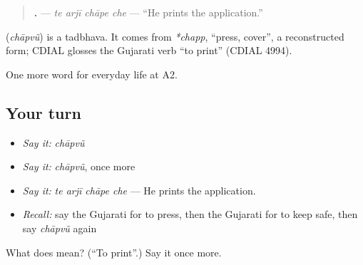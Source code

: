 \begin{quote}
\textbf{   .} — \emph{te arjī chāpe che} — \textquotedblleft{}He prints the application.\textquotedblright{}
\end{quote}

\begin{cousinweb}
\textbf{} (\emph{chāpvũ}) is a tadbhava. It comes from \emph{*chapp}, \textquotedblleft{}press, cover\textquotedblright{}, a reconstructed form; CDIAL glosses the Gujarati verb \textquotedblleft{}to print\textquotedblright{} (CDIAL 4994).
\end{cousinweb}

\begin{grammarlens}[title={What you've built}]
One more word for everyday life at A2.
\end{grammarlens}

\subsection*{Your turn}
\begin{itemize}
\raggedright
  \item \emph{Say it:} \emph{chāpvũ}
  \item \emph{Say it:} \emph{chāpvũ}, once more
  \item \emph{Say it:} \emph{te arjī chāpe che} — He prints the application.
  \item \emph{Recall:} say the Gujarati for to press, then the Gujarati for to keep safe, then say \emph{chāpvũ} again
\end{itemize}

\begin{tcolorbox}[breakable,colback=teal!4,colframe=teal!35!black,title={Before you move on}]
What does  mean? (\textquotedblleft{}To print\textquotedblright{}.) Say it once more.
\end{tcolorbox}
